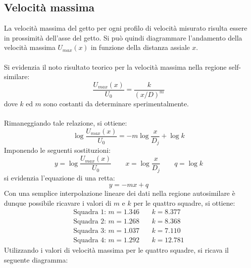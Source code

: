\subsection{Velocità massima}
La velocità massima del getto per ogni profilo di velocità misurato risulta essere in prossimità dell'asse del getto. Si può quindi diagrammare l'andamento della velocità massima $U_{max}(x)$ in funzione della distanza assiale $x$.\\\\
Si evidenzia il noto risultato teorico per la velocità massima nella regione self-similare:
\begin{equation*}
    \frac{U_{max}(x)}{U_0} = \frac{k}{(x/D)^m}
\end{equation*}
dove $k$ ed $m$ sono costanti da determinare sperimentalmente.\\\\
Rimaneggiando tale relazione, si ottiene:
\begin{equation*}
    \log \frac{U_{max}(x)}{U_0} = -m \log\frac{x}{D_j} + \log k
\end{equation*}
Imponendo le seguenti sostituzioni:
\begin{equation*}
    y = \log \frac{U_{max}(x)}{U_0} \qquad x = \log\frac{x}{D_j} \qquad q = \log k
\end{equation*}
si evidenzia l'equazione di una retta:
\begin{equation*}
    y = -mx + q
\end{equation*}
Con una semplice interpolazione lineare dei dati nella regione autosimilare è dunque possibile ricavare i valori di $m$ e $k$ per le quattro squadre, si ottiene:
\begin{equation*}
    \begin{split}
        \text{Squadra 1: } m = 1.346 &\quad k = 8.377\\
        \text{Squadra 2: } m = 1.268 &\quad k = 8.368\\
        \text{Squadra 3: } m = 1.037 &\quad k = 7.110\\
        \text{Squadra 4: } m = 1.292 &\quad k = 12.781
    \end{split}
\end{equation*}
Utilizzando i valori di velocità massima per le quattro squadre, si ricava il seguente diagramma:
